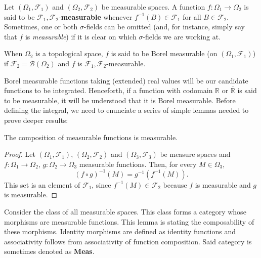\begin{defn}
Let \(\left(\Omega_1,\mathcal{F}_1\right)\) and
\(\left(\Omega_2,\mathcal{F}_2\right)\) be measurable spaces. A function
\(f\colon\Omega_1\to\Omega_2\) is said to be \(\mathcal{F}_1,\mathcal{F}_2\)-\textbf{measurable} whenever
\(f^{-1}(B)\in\mathcal{F}_1\) for all \(B\in\mathcal{F}_2\). Sometimes, one or both \(\sigma\)-fields can be omitted (and, for instance, simply say that \(f\) is \emph{measurable}) if it is clear on which \(\sigma\)-fields we are working at.
	
When \(\Omega_2\) is a topological space, \(f\) is said to be Borel measurable (on \(\left(\Omega_1,\mathcal{F}_1\right)\)) if \(\mathcal{F}_2=\mathscr{B}\left(\Omega_2\right)\) and \(f\) is \(\mathcal{F}_1,\mathcal{F}_2\)-measurable.  %
\end{defn}
Borel measurable functions taking (extended) real values will be our candidate functions to
be integrated. Henceforth, if a function with codomain \(\mathbb{R}\) or \(\overline{\mathbb{R}}\) is said to be measurable, it will be understood that it is Borel measurable. Before defining the integral, we need to enunciate a series
of simple lemmas needed to prove deeper results:

\begin{lemm}\label{lemma:composition of measurable functions} The composition
of measurable functions is measurable.
\end{lemm}
\begin{proof} Let \(\left(\Omega_1,\mathcal{F}_1\right)\), \(\left(\Omega_2,\mathcal{F}_2\right)\) and
\(\left(\Omega_3,\mathcal{F}_3\right)\) be measure spaces and \(f\colon\Omega_1\to\Omega_2\),
\(g\colon\Omega_2\to\Omega_3\) measurable functions. Then, for every
\(M\in \Omega_3\),
\[
	\left(f\circ g\right)^{-1}(M)=g^{-1}\left(f^{-1}(M)\right).
\]
This set is an element of \(\mathcal{F}_1\), since \(f^{-1}(M)\in \mathcal{F}_2\) because \(f\) is measurable
and \(g\) is measurable.
\end{proof}

Consider the class of all measurable spaces. This class forms a category whose
morphisms are measurable functions. This lemma is stating the composability of these morphisms.
Identity morphisms are defined as identity functions and
associativity follows from associativity of function composition. Said category
is sometimes denoted as \textbf{Meas}.

